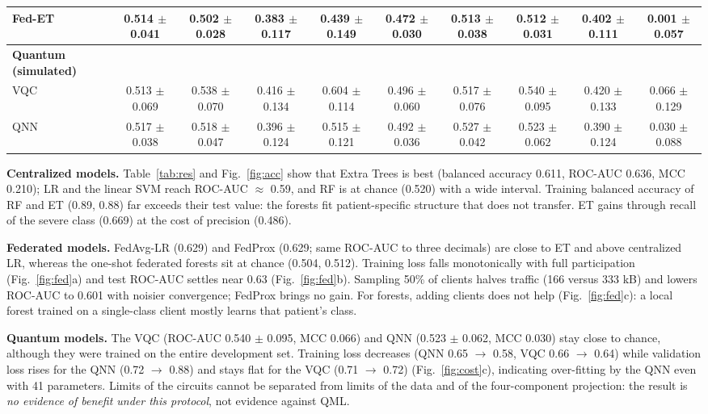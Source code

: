 \documentclass[conference,a4paper]{IEEEtran}
\begin{document}
\begin{table}[!t]
\begin{tabular}{lccccccccc}
Fed-ET & 0.514 $\pm$ 0.041 & 0.502 $\pm$ 0.028 & 0.383 $\pm$ 0.117 & 0.439 $\pm$ 0.149 & 0.472 $\pm$ 0.030 & 0.513 $\pm$ 0.038 & 0.512 $\pm$ 0.031 & 0.402 $\pm$ 0.111 & 0.001 $\pm$ 0.057\\
\midrule
\textbf{Quantum (simulated)} &  &  &  &  &  &  &  &  & \\
VQC & 0.513 $\pm$ 0.069 & 0.538 $\pm$ 0.070 & 0.416 $\pm$ 0.134 & 0.604 $\pm$ 0.114 & 0.496 $\pm$ 0.060 & 0.517 $\pm$ 0.076 & 0.540 $\pm$ 0.095 & 0.420 $\pm$ 0.133 & 0.066 $\pm$ 0.129\\
QNN & 0.517 $\pm$ 0.038 & 0.518 $\pm$ 0.047 & 0.396 $\pm$ 0.124 & 0.515 $\pm$ 0.121 & 0.492 $\pm$ 0.036 & 0.527 $\pm$ 0.042 & 0.523 $\pm$ 0.062 & 0.390 $\pm$ 0.124 & 0.030 $\pm$ 0.088\\
\bottomrule\end{tabular}\end{table}
\textbf{Centralized models.} Table~\ref{tab:res} and Fig.~\ref{fig:acc} show that Extra Trees is best (balanced accuracy 0.611, ROC-AUC 0.636, MCC 0.210); LR and the linear SVM reach ROC-AUC $\approx$ 0.59, and RF is at chance (0.520) with a wide interval. Training balanced accuracy of RF and ET (0.89, 0.88) far exceeds their test value: the forests fit patient-specific structure that does not transfer. ET gains through recall of the severe class (0.669) at the cost of precision (0.486).

\textbf{Federated models.} FedAvg-LR (0.629) and FedProx (0.629; same ROC-AUC to three decimals) are close to ET and above centralized LR, whereas the one-shot federated forests sit at chance (0.504, 0.512). Training loss falls monotonically with full participation (Fig.~\ref{fig:fed}a) and test ROC-AUC settles near 0.63 (Fig.~\ref{fig:fed}b). Sampling 50\% of clients halves traffic (166 versus 333 kB) and lowers ROC-AUC to 0.601 with noisier convergence; FedProx brings no gain. For forests, adding clients does not help (Fig.~\ref{fig:fed}c): a local forest trained on a single-class client mostly learns that patient's class.

\textbf{Quantum models.} The VQC (ROC-AUC 0.540 $\pm$ 0.095, MCC 0.066) and QNN (0.523 $\pm$ 0.062, MCC 0.030) stay close to chance, although they were trained on the entire development set. Training loss decreases (QNN 0.65 $\to$ 0.58, VQC 0.66 $\to$ 0.64) while validation loss rises for the QNN (0.72 $\to$ 0.88) and stays flat for the VQC (0.71 $\to$ 0.72) (Fig.~\ref{fig:cost}c), indicating over-fitting by the QNN even with 41 parameters. Limits of the circuits cannot be separated from limits of the data and of the four-component projection: the result is \textit{no evidence of benefit under this protocol}, not evidence against QML.
\end{document}

